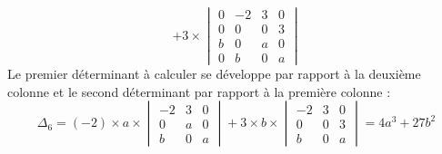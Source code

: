 \documentclass[11pt,a4paper]{article}
\begin{document}
\begin{enumerate}
$$+ 3  \times \begin{vmatrix}
0&-2&3&0 \\ 0&0&0&3 \\ b&0&a&0 \\ 0&b&0&a  
\end{vmatrix}
$$
Le premier déterminant à calculer se développe par rapport à la deuxième colonne et le second déterminant
par rapport à la première colonne :
$$\Delta_6 = (-2)\times a \times 
\begin{vmatrix}
-2&3&0 \\  0&a&0 \\ b&0&a  
\end{vmatrix}
+ 3  \times b \times 
\begin{vmatrix}
-2&3&0 \\ 0&0&3 \\ b&0&a  
\end{vmatrix}=4a^3+27b^2$$


\end{enumerate}
\end{document}
